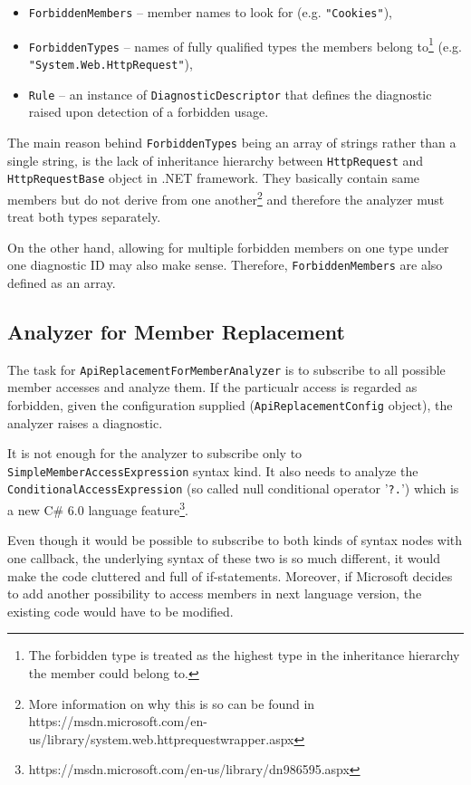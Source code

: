 \documentclass[
  digital, %
  table,   %
  lof,     %
  lot,     %
  oneside,
]{fithesis3}
\begin{document}
\begin{itemize}
  \item \texttt{ForbiddenMembers} -- member names to look for (e.g. \texttt{"Cookies"}), 
  \item \texttt{ForbiddenTypes} -- names of fully qualified types the members belong to\footnote{The forbidden type is treated as the highest type in the inheritance hierarchy the member could belong to.
} (e.g. \texttt{"System.Web.HttpRequest"}), 
  \item \texttt{Rule} -- an instance of \texttt{DiagnosticDescriptor} that defines the diagnostic raised upon detection of a forbidden usage.
\end{itemize} 

The main reason behind \texttt{ForbiddenTypes} being an array of strings rather than a single string, is the lack of inheritance hierarchy between \texttt{HttpRequest} and \texttt{HttpRequestBase} object in .NET framework. They basically contain same members but do not derive from one another\footnote{More information on why this is so can be found in https://msdn.microsoft.com/en-us/library/system.web.httprequestwrapper.aspx} and therefore the analyzer must treat both types separately. 

On the other hand, allowing for multiple forbidden members on one type under one diagnostic ID may also make sense. Therefore, \texttt{ForbiddenMembers} are also defined as an array.

\subsection{Analyzer for Member Replacement}
The task for \texttt{ApiReplacementForMemberAnalyzer} is to subscribe to all possible member accesses and analyze them. If the particualr access is regarded as forbidden, given the configuration supplied (\texttt{ApiReplacementConfig} object), the analyzer raises a diagnostic.

It is not enough for the analyzer to subscribe only to \texttt{SimpleMemberAccessExpression} syntax kind. It also needs to analyze the \texttt{ConditionalAccessExpression} (so called null conditional operator '\texttt{?.}') which is a new C\# 6.0 language feature\footnote{https://msdn.microsoft.com/en-us/library/dn986595.aspx}. 

Even though it would be possible to subscribe to both kinds of syntax nodes with one callback, the underlying syntax of these two is so much different, it would make the code cluttered and full of if-statements. Moreover, if Microsoft decides to add another possibility to access members in next language version, the existing code would have to be modified.
\end{document}
